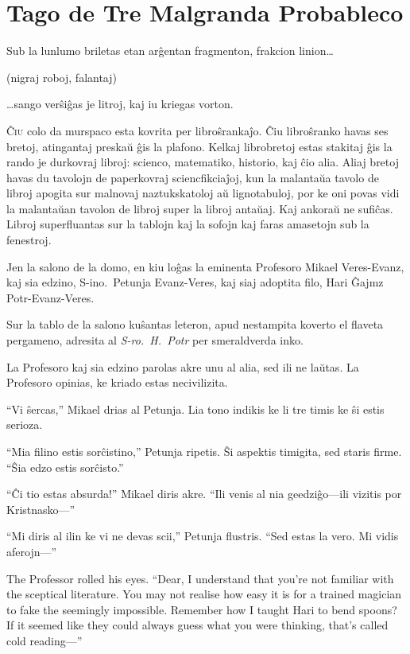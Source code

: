 \chapter{Tago de Tre Malgranda Probableco}

\begin{chapterOpeningQuote}
\noindent
Sub la lunlumo briletas etan arĝentan fragmenton, frakcion linion…

\vspace*{2ex}
(nigraj roboj, falantaj)

\vspace*{2ex}
…sango verŝiĝas je litroj, kaj iu kriegas vorton.
\end{chapterOpeningQuote}

\lettrine{Ĉ}{iu} colo da murspaco esta kovrita per libroŝrankaĵo. Ĉiu libroŝranko havas ses bretoj, atingantaj preskaŭ ĝis la plafono. Kelkaj librobretoj estas stakitaj ĝis la rando je durkovraj libroj: scienco, matematiko, historio, kaj ĉio alia. Aliaj bretoj havas du tavolojn de paperkovraj sciencfikciaĵoj, kun la malantaŭa tavolo de libroj apogita sur malnovaj naztukskatoloj aŭ lignotabuloj, por ke oni povas vidi la malantaŭan tavolon de libroj super la libroj antaŭaj. Kaj ankoraŭ ne sufiĉas. Libroj superfluantas sur la tablojn kaj la sofojn kaj faras amasetojn sub la fenestroj.

Jen la salono de la domo, en kiu loĝas la eminenta Profesoro Mikael Veres\nobreakdash-Evanz, kaj sia edzino, S\nobreakdash-ino.~Petunja Evanz\nobreakdash-Veres, kaj siaj adoptita filo, Hari Ĝajmz Potr-Evanz-Veres.

Sur la tablo de la salono kuŝantas leteron, apud nestampita koverto el flaveta pergameno, adresita al \emph{S\nobreakdash-ro.~H.~Potr} per smeraldverda inko.

La Profesoro kaj sia edzino parolas akre unu al alia, sed ili ne laŭtas. La Profesoro opinias, ke kriado estas necivilizita.

“Vi ŝercas,” Mikael drias al Petunja. Lia tono indikis ke li tre timis ke ŝi estis serioza.

“Mia filino estis sorĉistino,” Petunja ripetis. Ŝi aspektis timigita, sed staris firme. “Ŝia edzo estis sorĉisto.”

“Ĉi tio estas absurda!” Mikael diris akre. “Ili venis al nia geedziĝo—ili vizitis por Kristnasko—”

“Mi diris al ilin ke vi ne devas scii,” Petunja flustris. “Sed estas la vero. Mi vidis aferojn—”

The Professor rolled his eyes. “Dear, I understand that you’re not familiar with the sceptical literature. You may not realise how easy it is for a trained magician to fake the seemingly impossible. Remember how I taught Hari to bend spoons? If it seemed like they could always guess what you were thinking, that’s called cold reading—”

